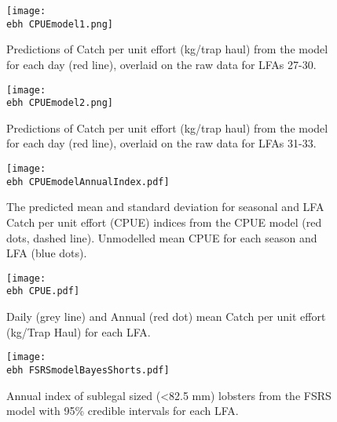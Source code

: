 
    \begin{figure}
    \centering
        \texttt{[image: \\ebh CPUEmodel1.png]}
        \caption{Predictions of Catch per unit effort (kg/trap haul) from the model for each day (red line), overlaid on the raw data for LFAs 27-30. }

    \end{figure}


    \begin{figure}
    \centering
        \texttt{[image: \\ebh CPUEmodel2.png]}
        \caption{Predictions of Catch per unit effort (kg/trap haul) from the model for each day (red line), overlaid on the raw data for LFAs 31-33.}

    \end{figure}

    \begin{figure}
    \centering
        \texttt{[image: \\ebh CPUEmodelAnnualIndex.pdf]}
        \caption{The predicted mean and standard deviation for seasonal and LFA Catch per unit effort (CPUE) indices from the CPUE model (red dots, dashed line). Unmodelled mean CPUE for each season and LFA (blue dots).}

    \end{figure}


    \begin{figure}
    \centering
        \texttt{[image: \\ebh CPUE.pdf]}
        \caption{Daily (grey line) and Annual (red dot) mean Catch per unit effort (kg/Trap Haul) for each LFA.}

    \end{figure}




    \begin{figure}
    \centering
        \texttt{[image: \\ebh FSRSmodelBayesShorts.pdf]}
        \caption{Annual index of sublegal sized (\textless 82.5 mm) lobsters from the FSRS model with 95\% credible intervals for each LFA.}

    \end{figure}


